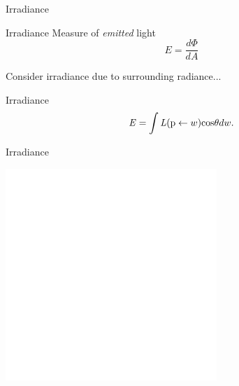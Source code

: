 \documentclass[compress,professionalfont]{beamer}
\begin{document}
\begin{frame}{Irradiance}

    \begin{block}{Irradiance}
        Measure of {\em emitted} light
        \[
            E = \frac{d\Phi}{dA}
        \]

    \end{block}

    Consider irradiance due to surrounding radiance...

    \begin{block}{Irradiance}
        \[
            \mathit{E} = \int\mathit{L}(\textup{p} \leftarrow w)\textup{cos}\theta dw.
        \]
    \end{block}

\end{frame}




\begin{frame}{Irradiance}

    \centering
    \vspace{-1cm}
    \includegraphics[height=80mm]{../img/diag/radiance.pdf}

\end{frame}
\end{document}
